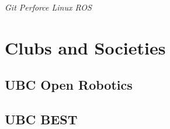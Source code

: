 \documentclass[]{aftab-resume}
\begin{document}
\begin{minipage}[t]{0.33\textwidth}
\it{\textbullet{} Git \textbullet{} Perforce \textbullet{} Linux \textbullet{} ROS \\}

\sectionsep


\section{Clubs and Societies} 
\vspace{0.15cm}

\subsection{UBC Open Robotics}
\vspace{0.175cm}
\subsection{UBC BEST}
\sectionsep

%
%

\end{minipage} 
\hfill
\end{document}
